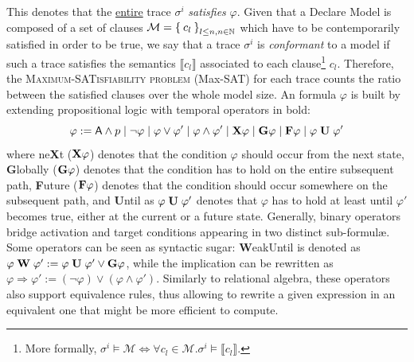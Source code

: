  This
 denotes that the \underline{entire} trace $\sigma^i$ \textit{satisfies} $\varphi$. Given that a Declare Model  is composed of a set of clauses $\mathcal{M}=\Set{c_l}_{l\leq n,n\in\mathbb{N}}$ which have to be contemporarily satisfied in order to be true, we say that a trace $\sigma^i$ is \textit{conformant} to a model if such a trace satisfies the  \LTLf semantics $\llbracket c_l\rrbracket$ associated to each clause\footnote{More formally, $\sigma^i\vDash\mathcal{M}\Leftrightarrow \forall c_l\in \mathcal{M}. \sigma^i\vDash\llbracket c_l\rrbracket$.} $c_l$. Therefore, the \textsc{Maximum-SATisfiability problem} (Max-SAT) for each trace counts the ratio between the satisfied clauses over the whole model size.
 An \LTLf formula $\varphi$ is built by extending propositional logic with temporal operators in bold: \[\varphi:=\textsf{A}\wedge p\;|\;\neg \varphi\;|\;\varphi\vee \varphi'\;|\;\varphi\wedge\varphi'\;|\;\mathbf{X}{\varphi}\;|\;\mathbf{G}{\varphi}\;|\;\mathbf{F}{\varphi}\;|\;{\varphi}\;\mathbf{U}\;{\varphi'}\] where ne\textbf{X}t ($\mathbf{X}{\varphi}$) denotes that the condition $\varphi$ should occur from the next state, \textbf{G}lobally ($\mathbf{G}{\varphi}$) denotes that the condition has to hold on the entire subsequent path, \textbf{F}uture ($\mathbf{F}{\varphi}$) denotes that the condition should occur somewhere on the subsequent path, and \textbf{U}ntil as ${\varphi}\;\mathbf{U}\;{\varphi'}$ denotes that $\varphi$ has to hold at least until $\varphi'$ becomes true, either at the current or a future state. Generally, binary operators bridge activation and target conditions appearing in two distinct sub-formul\ae. Some operators can be seen as syntactic sugar: \textbf{W}eakUntil is denoted as  ${\varphi}\;\mathbf{W}\;{\varphi'}:={\varphi}\;\mathbf{U}\;{\varphi'}\vee\mathbf{G}{\varphi}$, while the implication can be rewritten as $\varphi\Rightarrow\varphi':=(\neg \varphi)\vee (\varphi\wedge \varphi')$. 
 Similarly to relational algebra, these operators also support equivalence rules, thus allowing to rewrite a given \LTLf expression in an equivalent one that might be more efficient to compute.

